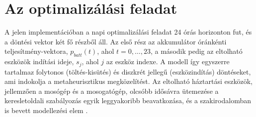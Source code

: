 \section{Az optimalizálási feladat}\label{sec:feladat}
A jelen implementációban a napi optimalizálási feladat 24 órás horizonton fut, és a döntési vektor két fő részből áll. Az első rész az akkumulátor óránkénti teljesítmény-vektora, $p_{batt}(t)$, ahol $t=0,\dots,23$, a második pedig az eltolható eszközök indítási ideje, $s_j$, ahol $j$ az eszköz indexe. A modell így egyszerre tartalmaz folytonos (töltés-kisütés) és diszkrét jellegű (eszközindítás) döntéseket, ami indokolja a metaheurisztikus megközelítést. Az eltolható háztartási eszközök, jellemzően a mosógép és a mosogatógép, olcsóbb idősávra ütemezése a keresletoldali szabályozás egyik leggyakoribb beavatkozása, és a szakirodalomban is bevett modellezési elem \cite{Setlhaolo2014, Logenthiran2012}.


